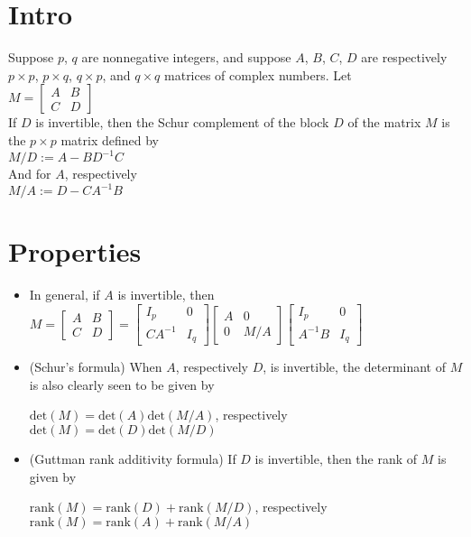 \documentclass[12pt]{article}
\begin{document}
\section*{Intro}

Suppose $p$, $q$ are nonnegative integers, and suppose $A$, $B$, $C$, $D$ 
are respectively $p \times p$, $p \times q$, $q \times p$, and $q \times q$ 
matrices of complex numbers. Let\\

$
M = \begin{bmatrix}
    A & B \\ C & D
\end{bmatrix}
$\\

If $D$ is invertible, then the Schur complement of the block $D$ of the matrix 
$M$ is the $p \times p$ matrix defined by\\

$
M / D := A - B D^{-1}C
$\\

And for $A$, respectively\\

$
M / A := D - CA^{-1}B
$

\section*{Properties}

\begin{itemize}
    \item In general, if $A$ is invertible, then 
    $
    M = \begin{bmatrix} A & B \\ C & D \end{bmatrix} = 
    \begin{bmatrix}I_p & 0 \\ CA^{-1} & I_q \end{bmatrix}
    \begin{bmatrix}A & 0 \\ 0 & M / A \end{bmatrix}
    \begin{bmatrix}I_p & 0 \\ A^{-1}B & I_q \end{bmatrix}
    $

    \item (Schur's formula) When $A$, respectively $D$, is invertible, 
    the determinant of $M$ is also clearly seen to be given by
    \begin{sloppypar}
        $\text{det}(M) = \text{det}(A) \text{det}(M / A)$, respectively\\
        $\text{det}(M) = \text{det}(D) \text{det}(M / D)$
    \end{sloppypar}

    \item (Guttman rank additivity formula) If $D$ is invertible, 
    then the rank of $M$ is given by
    \begin{sloppypar}
        $\text{rank}(M) = \text{rank}(D) + \text{rank}(M / D)$, respectively\\
        $\text{rank}(M) = \text{rank}(A) + \text{rank}(M / A)$
    \end{sloppypar}
\end{itemize}
\end{document}
